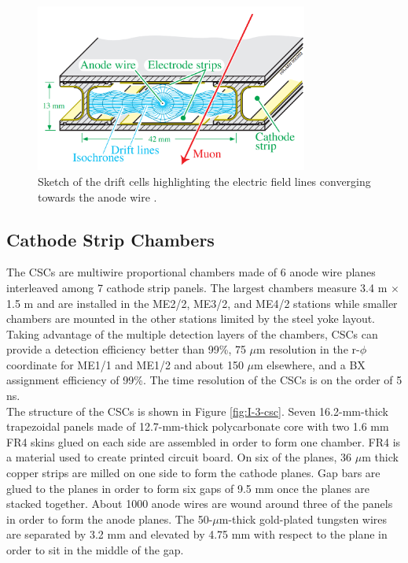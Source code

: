       \begin{figure}[b!]
        \centering
        \includegraphics[width=0.8\textwidth]{img/I-3-cms/dt.png}
        \caption{Sketch of the drift cells highlighting the electric field lines converging towards the anode wire \cite{1748-0221-3-08-S08004}.}
        \label{fig:I-3-dt}
      \end{figure}

  	\subsection{Cathode Strip Chambers}

      The CSCs are multiwire proportional chambers made of 6 anode wire planes interleaved among 7 cathode strip panels. The largest chambers measure 3.4 m $ \times $ 1.5 m and are installed in the ME2/2, ME3/2, and ME4/2 stations while smaller chambers are mounted in the other stations limited by the steel yoke layout. Taking advantage of the multiple detection layers of the chambers, CSCs can provide a detection efficiency better than 99\%, 75 $\mu$m resolution in the r-$\phi$ coordinate for ME1/1 and ME1/2 and about 150 $\mu$m elsewhere, and a BX assignment efficiency of 99\%. The time resolution of the CSCs is on the order of 5 ns. \\

      The structure of the CSCs is shown in Figure \ref{fig:I-3-csc}. Seven 16.2-mm-thick trapezoidal panels made of 12.7-mm-thick polycarbonate core with two 1.6 mm FR4 skins glued on each side are assembled in order to form one chamber. FR4 is a material used to create printed circuit board. On six of the planes, 36 $\mu$m thick copper strips are milled on one side to form the cathode planes. Gap bars are glued to the planes in order to form six gaps of 9.5 mm once the planes are stacked together. About 1000 anode wires are wound around three of the panels in order to form the anode planes. The 50-$\mu$m-thick gold-plated tungsten wires are separated by 3.2 mm and elevated by 4.75 mm with respect to the plane in order to sit in the middle of the gap.

